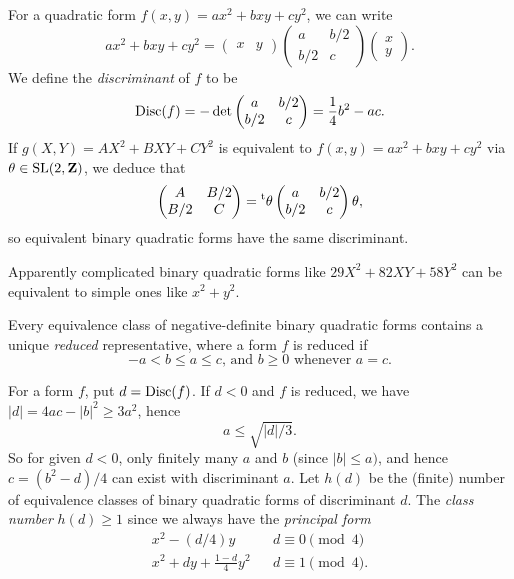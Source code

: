 For a quadratic form $f(x,y) = a x^2+b x y+c y^2$, we can write 
\[
  a x^2 + b x y+c y^2 = \begin{pmatrix} x & y \end{pmatrix} \begin{pmatrix} a & b/2 \\ b/2 & c \end{pmatrix} \begin{pmatrix} x \\ y \end{pmatrix} .
\]
We define the \emph{discriminant} of $f$ to be 
\[
  \operatorname{Disc}(f) = -\det\begin{pmatrix} a & b/2 \\ b/2 & c \end{pmatrix} = \frac 1 4 b^2 - a c .
\]
If $g(X,Y) = A X^2+B X Y+C Y^2$ is equivalent to $f(x,y) = a x^2+b x y+c y^2$ 
via $\theta\in \operatorname{SL}(2,\mathbf{Z})$, we deduce that 
\[
  \begin{pmatrix} A & B/2 \\ B/2 & C \end{pmatrix} = \prescript{\mathrm{t}}{}{\theta} \begin{pmatrix} a & b/2 \\ b/2 & c \end{pmatrix} \theta,
\]
so equivalent binary quadratic forms have the same discriminant. 

Apparently complicated binary quadratic forms like $29 X^2+82 X Y+58 Y^2$ can 
be equivalent to simple ones like $x^2+y^2$. 

\begin{theo}[Gauss]
Every equivalence class of negative-definite binary quadratic forms contains 
a unique \emph{reduced} representative, where a form $f$ is reduced if 
\[
  -a<b\leqslant a\leqslant c \text{, and }b\geqslant 0\text{ whenever } a=c .
\]
\end{theo}

For a form $f$, put $d=\operatorname{Disc}(f)$. If $d<0$ and $f$ is reduced, we 
have $|d|=4 a c-|b|^2 \geqslant 3 a^2$, hence 
\[
  a\leqslant \sqrt{|d|/3} .
\]
So for given $d<0$, only finitely many $a$ and $b$ (since $|b|\leqslant a)$, 
and hence $c=(b^2-d)/4$ can exist with discriminant $a$. Let $h(d)$ be the 
(finite) number of equivalence classes of binary quadratic forms of 
discriminant $d$. The \emph{class number} $h(d)\geqslant 1$ since we always 
have the \emph{principal form} 
\begin{align*}
  x^2-(d/4) y && d\equiv 0\pmod 4 \\
  x^2+d y+\frac{1-d}{4} y^2 && d\equiv 1\pmod 4 .
\end{align*}

